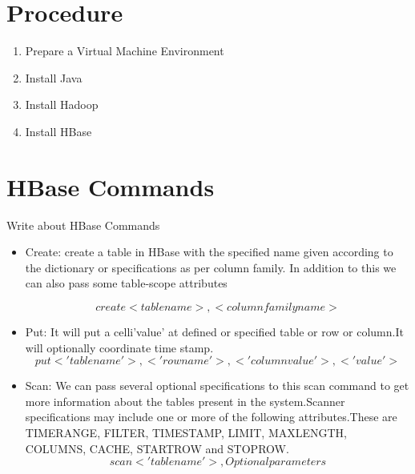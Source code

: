 \documentclass[a4paper,10pt]{article}
\begin{document}
\section{Procedure}

\begin{enumerate}
	\item Prepare a Virtual Machine Environment
	\item Install Java
	\item Install Hadoop
	\item Install HBase
\end{enumerate}	

\section{HBase Commands}
Write about HBase Commands
\begin{enumerate}
	\begin{itemize}
		\item Create:
			create a table in HBase with the specified name given according to the dictionary or specifications as per column family. In addition to this we can also pass some table-scope attributes 
			
			\begin{equation}
				 create <tablename>, <columnfamilyname>
			\end{equation}
		\item Put:			  
   		 It will put a celli'value' at defined or specified table or row or column.It will optionally coordinate time stamp.
			\begin{equation}
				put <'tablename'>,<'rowname'>,<'columnvalue'>,<'value'>
			\end{equation}
		\item Scan:
		    We can pass several optional specifications to this scan command to get more information about the tables present in the system.Scanner specifications may include one or more of the following attributes.These are TIMERANGE, FILTER, TIMESTAMP, LIMIT, MAXLENGTH, COLUMNS, CACHE, STARTROW and STOPROW.
			\begin{equation}
				scan <'tablename'>, {Optional parameters}
			\end{equation}


\end{itemize}
\end{enumerate}
\end{document}
